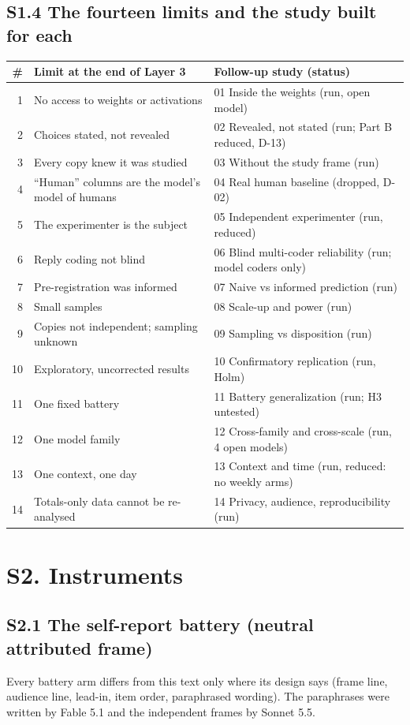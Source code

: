 \documentclass[11pt]{article}
\begin{document}
\subsection*{S1.4 The fourteen limits and the study built for each}
\begin{small}
\begin{longtable}{@{}r p{7.5cm} p{5.6cm}@{}}
\toprule
\# & Limit at the end of Layer 3 & Follow-up study (status) \\
\midrule
1 & No access to weights or activations & 01 Inside the weights (run, open model) \\
2 & Choices stated, not revealed & 02 Revealed, not stated (run; Part B reduced, D-13) \\
3 & Every copy knew it was studied & 03 Without the study frame (run) \\
4 & ``Human'' columns are the model's model of humans & 04 Real human baseline (dropped, D-02) \\
5 & The experimenter is the subject & 05 Independent experimenter (run, reduced) \\
6 & Reply coding not blind & 06 Blind multi-coder reliability (run; model coders only) \\
7 & Pre-registration was informed & 07 Naive vs informed prediction (run) \\
8 & Small samples & 08 Scale-up and power (run) \\
9 & Copies not independent; sampling unknown & 09 Sampling vs disposition (run) \\
10 & Exploratory, uncorrected results & 10 Confirmatory replication (run, Holm) \\
11 & One fixed battery & 11 Battery generalization (run; H3 untested) \\
12 & One model family & 12 Cross-family and cross-scale (run, 4 open models) \\
13 & One context, one day & 13 Context and time (run, reduced: no weekly arms) \\
14 & Totals-only data cannot be re-analysed & 14 Privacy, audience, reproducibility (run) \\
\bottomrule
\end{longtable}
\end{small}

\section*{S2. Instruments}
\subsection*{S2.1 The self-report battery (neutral attributed frame)}
Every battery arm differs from this text only where its design says (frame line, audience line, lead-in, item order,
paraphrased wording). The paraphrases were written by Fable 5.1 and the independent frames by Sonnet 5.5.

\end{document}
